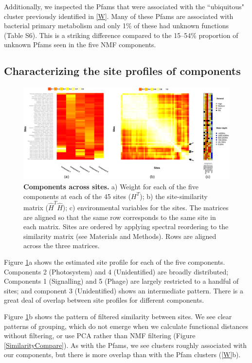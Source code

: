 Additionally, we inspected the Pfams that were associated with the ``ubiquitous" cluster previously identified in \ref{W}. Many of these Pfams are associated with bacterial primary metabolism and only 1\% of these had unknown functions (Table S6). This is a striking difference compared to the 15--54\% proportion of unknown Pfams seen in the five NMF components. 

\subsection{Characterizing the site profiles of components}

\begin{figure}
\centering
\includegraphics[width=\textwidth]{NMF/figures/fig3}
\caption{\textbf{Components across sites.} a) Weight for each of the five components at each of the 45 sites ($H^T$);  b) the site-similarity matrix ($\hat H^T \hat H$); c) environmental variables for the sites.  The matrices are aligned so that the same row corresponds to the same site in each matrix.  Sites are ordered by applying spectral reordering to the similarity matrix (see Materials and Methods). Rows are aligned across the three matrices.}
\label{H} 
\end{figure}

Figure \ref{H}a shows the estimated site profile for each of the five components.  Components 2 (Photosystem) and 4 (Unidentified) are broadly distributed;  Components 1 (Signalling) and 5 (Phage) are largely restricted to a handful of sites; and component 3 (Unidentified) shows an intermediate pattern.  There is a great deal of overlap between site profiles for different components.   

Figure \ref{H}b shows the pattern of filtered similarity between sites.  We see clear patterns of grouping, which do not emerge when we calculate functional distances without filtering, or use PCA rather than NMF filtering (Figure \ref{SimilarityCompare}). As with the Pfams, we see clusters roughly associated with our components, but there is more overlap than with the Pfam clusters (\ref{W}b).

